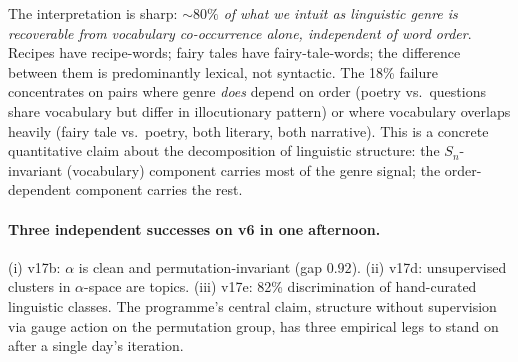 \documentclass[11pt, a4paper]{article}
\theoremstyle{plain}
\theoremstyle{definition}
\theoremstyle{remark}
\begin{document}
The interpretation is sharp: \emph{$\sim 80\%$ of what we intuit as linguistic genre is recoverable from vocabulary co-occurrence alone, independent of word order}.
Recipes have recipe-words; fairy tales have fairy-tale-words; the difference between them is predominantly lexical, not syntactic.
The 18\% failure concentrates on pairs where genre \emph{does} depend on order (poetry vs.\ questions share vocabulary but differ in illocutionary pattern) or where vocabulary overlaps heavily (fairy tale vs.\ poetry, both literary, both narrative).
This is a concrete quantitative claim about the decomposition of linguistic structure: the $S_n$-invariant (vocabulary) component carries most of the genre signal; the order-dependent component carries the rest.

\paragraph{Three independent successes on v6 in one afternoon.}
(i) v17b: $\alpha$ is clean and permutation-invariant (gap $0.92$).
(ii) v17d: unsupervised clusters in $\alpha$-space are topics.
(iii) v17e: 82\% discrimination of hand-curated linguistic classes.
The programme's central claim, structure without supervision via gauge action on the permutation group, has three empirical legs to stand on after a single day's iteration.
\end{document}
